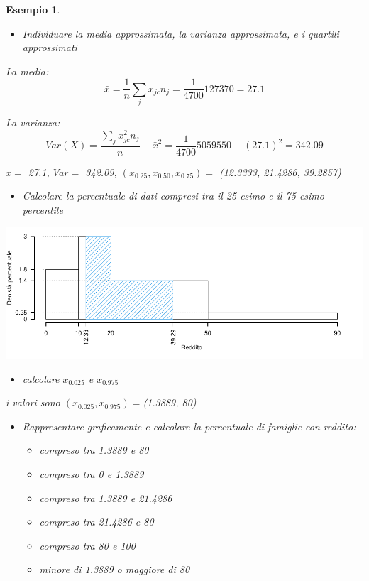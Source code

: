 \documentclass[
  11pt,
]{book}
\providecommand{\tightlist}{%
  \setlength{\itemsep}{0pt}\setlength{\parskip}{0pt}}
\theoremstyle{mytheoremstyle}
\theoremstyle{mydefstyle}
\newtheorem{example}{{Esempio}}[section]
\begin{document}
\begin{example}
\begin{itemize}
\tightlist
\item
  Individuare la media approssimata, la varianza approssimata, e i quartili approssimati
\end{itemize}

La media:
\[\bar x = \frac 1 n \sum_j x_{jc} n_j = \frac 1{4700}127370=27.1 \]

La varianza:
\[Var(X)=\frac {\sum_j x_{jc}^2 n_j }{n}-\bar x^2=\frac 1{4700}5059550-(27.1)^2=342.09\]

\(\bar x=\) 27.1, \(Var=\) 342.09, \((x_{0.25},x_{0.50},x_{0.75})=\) (12.3333, 21.4286, 39.2857)

\begin{itemize}
\tightlist
\item
  Calcolare la percentuale di dati compresi tra il 25-esimo e il 75-esimo percentile
\end{itemize}

\begin{center}\includegraphics{Appunti_di_Statistica_2025_files/figure-latex/decili-g4-1} \end{center}

\begin{itemize}
\tightlist
\item
  calcolare \(x_{0.025}\) e \(x_{0.975}\)
\end{itemize}

i valori sono \((x_{0.025}, x_{0.975})=\)(1.3889, 80)

\begin{itemize}
\tightlist
\item
  Rappresentare graficamente e calcolare la percentuale di famiglie con reddito:

  \begin{itemize}
  \tightlist
  \item
    compreso tra 1.3889 e 80
  \item
    compreso tra 0 e 1.3889
  \item
    compreso tra 1.3889 e 21.4286
  \item
    compreso tra 21.4286 e 80
  \item
    compreso tra 80 e 100
  \item
    minore di 1.3889 o maggiore di 80
  \end{itemize}
\end{itemize}

\end{example}
\end{document}
